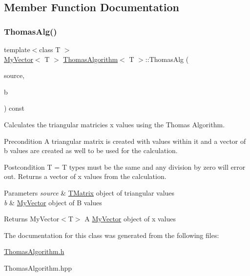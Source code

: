 \subsection{Member Function Documentation}
\mbox{\label{class_thomas_algorithm_a95ca444b7b9193ab8dafbfb5b0cea042}} 
\subsubsection{\texorpdfstring{ThomasAlg()}{ThomasAlg()}}
{\footnotesize\ttfamily template$<$class T $>$ \\
\mbox{\hyperlink{class_my_vector}{My\+Vector}}$<$ T $>$ \mbox{\hyperlink{class_thomas_algorithm}{Thomas\+Algorithm}}$<$ T $>$\+::Thomas\+Alg (\begin{DoxyParamCaption}\item[{const \mbox{\hyperlink{class_t_matrix}{T\+Matrix}}$<$ T $>$ \&}]{source,  }\item[{const \mbox{\hyperlink{class_my_vector}{My\+Vector}}$<$ T $>$}]{b }\end{DoxyParamCaption}) const}



Calculates the triangular matricies x values using the Thomas Algorithm. 

\begin{DoxyPrecond}{Precondition}
A triangular matrix is created with values within it and a vector of b values are created as well to be used for the calculation. 
\end{DoxyPrecond}
\begin{DoxyPostcond}{Postcondition}
T = T types must be the same and any division by zero will error out. Returns a vector of x values from the calculation.
\end{DoxyPostcond}

\begin{DoxyParams}{Parameters}
{\em source} & \mbox{\hyperlink{class_t_matrix}{T\+Matrix}} object of triangular values \\
\hline
{\em b} & \mbox{\hyperlink{class_my_vector}{My\+Vector}} object of B values \\
\hline
\end{DoxyParams}
\begin{DoxyReturn}{Returns}
My\+Vector$<$\+T$>$ A \mbox{\hyperlink{class_my_vector}{My\+Vector}} object of x values 
\end{DoxyReturn}


The documentation for this class was generated from the following files\+:\begin{DoxyCompactItemize}
\item 
\mbox{\hyperlink{_thomas_algorithm_8h}{Thomas\+Algorithm.\+h}}\item 
Thomas\+Algorithm.\+hpp\end{DoxyCompactItemize}
